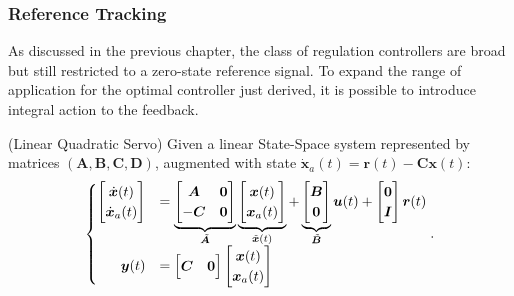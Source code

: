 \documentclass[a4paper,11pt]{book}
\numberwithin{figure}{chapter}
\numberwithin{equation}{chapter}
\numberwithin{table}{chapter}
\theoremstyle{definition}
\newtheorem{definition}{Definition}[chapter]
\newcounter{boxed-theorem}
\newcounter{boxed-lemma}
\newcounter{boxed-definition}
\newenvironment{boxed-definition}[1]
{\colorlet{shadecolor}{pastelYellow!15} \begin{shaded} \begin{definition}{#1}}
{\end{definition} \end{shaded}}
\newcounter{boxed-example}
\begin{document}
\subsubsection{Reference Tracking}

As discussed in the previous chapter, the class of regulation controllers are broad but still restricted to a zero-state reference signal. To expand the range of application for the optimal controller just derived, it is possible to introduce integral action to the feedback.

\begin{boxed-definition}{(Linear Quadratic Servo)} \label{def:lqServo}
    Given a linear State-Space system represented by matrices $(\bm{A}, \bm{B}, \bm{C}, \bm{D})$, augmented with state $\dot{\bm{x}}_a(t) = \bm{r}(t) - \bm{C} \bm{x}(t)$:
    \begin{align} 
    \begin{cases}
        \begin{bmatrix}
            \dot{\bm{x}}(t) \\
            \dot{\bm{x}}_a(t)
        \end{bmatrix} &= \underbrace{\begin{bmatrix}
            \bm{A}  & \bm{0} \\ - \bm{C} & \bm{0}
        \end{bmatrix}}_{\tilde{\bm{A}}} \underbrace{\begin{bmatrix}
            \bm{x}(t) \\
            \bm{x}_a(t)
        \end{bmatrix}}_{\tilde{\bm{x}}(t)} + \underbrace{\begin{bmatrix}
            \bm{B} \\
            \bm{0}
        \end{bmatrix}}_{\tilde{\bm{B}}} \bm{u}(t) + \begin{bmatrix}
            \bm{0} \\
            \bm{I}
        \end{bmatrix} \bm{r}(t)
        \\
        \hfill \bm{y}(t) &= \begin{bmatrix}
            \bm{C} & \bm{0}
        \end{bmatrix} \begin{bmatrix}
            \bm{x}(t) \\
            \bm{x}_a(t)
        \end{bmatrix}
    \end{cases}
    .\end{align}
    

\end{boxed-definition}
\end{document}
